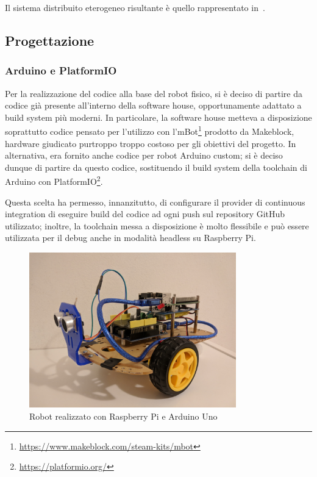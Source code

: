 Il sistema distribuito eterogeneo risultante è quello rappresentato in~.

\subsection{Progettazione}

\subsubsection{Arduino e PlatformIO}

Per la realizzazione del codice alla base del robot fisico, si è deciso di partire da codice già presente all'interno della software house, opportunamente adattato a build system più moderni.
In particolare, la software house metteva a disposizione soprattutto codice pensato per l'utilizzo con l'mBot\footnote{\url{https://www.makeblock.com/steam-kits/mbot}} prodotto da Makeblock, hardware giudicato purtroppo troppo costoso per gli obiettivi del progetto.
In alternativa, era fornito anche codice per robot Arduino custom; si è deciso dunque di partire da questo codice, sostituendo il build system della toolchain di Arduino con PlatformIO\footnote{\url{https://platformio.org/}}.

Questa scelta ha permesso, innanzitutto, di configurare il provider di continuous integration di eseguire build del codice ad ogni push sul repository GitHub utilizzato;
inoltre, la toolchain messa a disposizione è molto flessibile e può essere utilizzata per il debug anche in modalità headless su Raspberry Pi.

\begin{figure}[H]
  \centering
  \includegraphics[width=0.8\textwidth]{res/sprint4/robot-angle.jpg}%
  \caption{Robot realizzato con Raspberry Pi e Arduino Uno}%
  \label{fig:sp4:robot-hw}
\end{figure}

